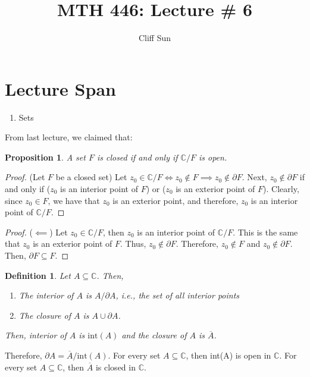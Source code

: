 \documentclass{article}
\title{MTH 446: Lecture \# 6}
\author{Cliff Sun}
\newtheorem{definition}[theorem]{Definition}
\newtheorem{proposition}[theorem]{Proposition}
\newtheorem{one minute paper}[theorem]{One Minute Paper}
\begin{document}
\maketitle

\section*{Lecture Span}
\begin{enumerate}
    \item Sets
\end{enumerate}

From last lecture, we claimed that: 

\begin{proposition}
    A set $F$ is closed if and only if $\mathbb{C}/F$ is open. 
\end{proposition}

\begin{proof}
    (Let $F$ be a closed set) Let $z_0 \in \mathbb{C}/F \iff z_0 \notin F \implies z_0 \notin \partial F$. Next, $z_0 \notin \partial F$ if and only if ($z_0$ is an interior point of $F$) or ($z_0$ is an exterior point of $F$). Clearly, since $z_0 \in F$, we have that $z_0$ is an exterior point, 
    and therefore, $z_0$ is an interior point of $\mathbb{C}/F$. 
\end{proof}

\begin{proof}
    ($\impliedby$) Let $z_0 \in \mathbb{C}/F$, then $z_0$ is an interior point of $\mathbb{C}/F$. This is the same that $z_0$ is an exterior point of $F$. Thus, $z_0 \notin \partial F$. Therefore, $z_0 \notin F$ and $z_0 \notin \partial F$. Then, $\partial F \subseteq F$.
\end{proof}

\begin{definition}
    Let $A \subseteq \mathbb{C}$. Then, 
    \begin{enumerate}
        \item The interior of $A$ is $A/\partial A$, i.e., the set of all interior points
        \item The closure of $A$ is $A \cup \partial A$.  
    \end{enumerate}
    Then, interior of $A$ is $\text{int}(A)$ and the closure of $A$ is $\overline{A}$. 
\end{definition}

Therefore, $\partial A = \overline{A}/\text{int}(A)$. For every set $A \subseteq \mathbb{C}$, then int(A) is open in $\mathbb{C}$. For every set $A \subseteq \mathbb{C}$, then $\overline{A}$ is closed in $\mathbb{C}$. 
\end{document}
